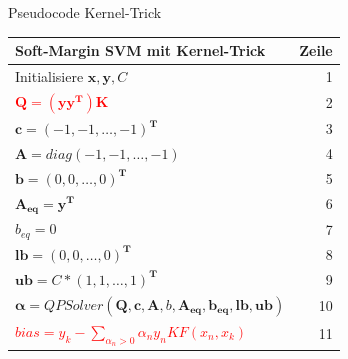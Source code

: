 \documentclass[ngerman]{beamer}
\begin{document}
\begin{frame}{Pseudocode Kernel-Trick}
    \centering
    \begin{tabular}{l r}
        \textbf{Soft-Margin SVM mit Kernel-Trick} & \textbf{Zeile} \\
        \hline
        Initialisiere $\mathbf{x}, \mathbf{y}, C$ & 1\\ \pause
        \textcolor{red}{$\mathbf{Q} = (\mathbf{y}\mathbf{y}^{\mathbf{T}})\mathbf{K}$} & 2\\ \pause
        $\mathbf{c} = \left( -1, -1, \ldots, -1 \right)^{\mathbf{T}}$ & 3 \\
        $\mathbf{A} = diag\left( -1, -1, \ldots, -1 \right)$ & 4 \\
        $\mathbf{b} = \left( 0, 0, \ldots, 0 \right)^{\mathbf{T}}$ & 5\\
        $\mathbf{A_{eq}} = \mathbf{y}^{\mathbf{T}}$ & 6\\
        $b_{eq} = 0$ & 7\\
        $\mathbf{lb} = \left( 0, 0, \ldots, 0 \right)^{\mathbf{T}}$ & 8 \\
        $\mathbf{ub} = C * \left( 1, 1, \ldots, 1 \right)^{\mathbf{T}}$ & 9 \\
        $\mathbf{\alpha} = QPSolver\left( \mathbf{Q}, \mathbf{c}, \mathbf{A}, b, \mathbf{A_{eq}}, \mathbf{b_{eq}}, \mathbf{lb}, \mathbf{ub} \right)$ & 10\\ \pause
        \textcolor{red}{$bias = y_{k} - \sum\limits_{\alpha_{n} > 0} \alpha_{n} y_{n} KF\left( x_{n}, x_{k} \right) $} & 11 \\
    \end{tabular}
\end{frame}
\end{document}
